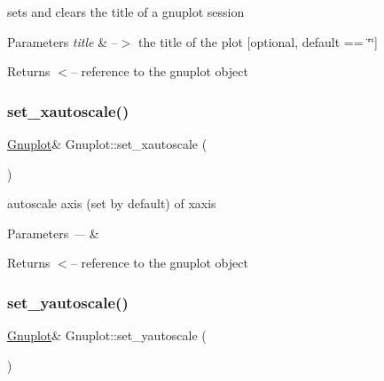 sets and clears the title of a gnuplot session 


\begin{DoxyParams}{Parameters}
{\em title} & --$>$ the title of the plot \mbox{[}optional, default == \char`\"{}\char`\"{}\mbox{]}\\
\hline
\end{DoxyParams}
\begin{DoxyReturn}{Returns}
$<$-- reference to the gnuplot object 
\end{DoxyReturn}
\mbox{\label{classGnuplot_a11a62a04c203f01607c3c21a727e318d}} 
\subsubsection{\texorpdfstring{set\+\_\+xautoscale()}{set\_xautoscale()}}
{\footnotesize\ttfamily \hyperlink{classGnuplot}{Gnuplot}\& Gnuplot\+::set\+\_\+xautoscale (\begin{DoxyParamCaption}{ }\end{DoxyParamCaption})\hspace{0.3cm}{\ttfamily [inline]}}

autoscale axis (set by default) of xaxis


\begin{DoxyParams}{Parameters}
{\em ---} & \\
\hline
\end{DoxyParams}
\begin{DoxyReturn}{Returns}
$<$-- reference to the gnuplot object 
\end{DoxyReturn}
\mbox{\label{classGnuplot_a5b9e1a4e68f94d418a8e9194f168b448}} 
\subsubsection{\texorpdfstring{set\+\_\+yautoscale()}{set\_yautoscale()}}
{\footnotesize\ttfamily \hyperlink{classGnuplot}{Gnuplot}\& Gnuplot\+::set\+\_\+yautoscale (\begin{DoxyParamCaption}{ }\end{DoxyParamCaption})\hspace{0.3cm}{\ttfamily [inline]}}

